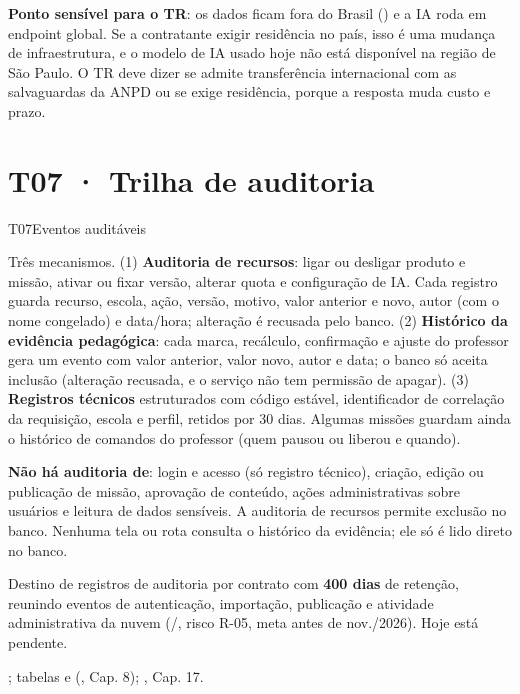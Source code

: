 \begin{atencao}
\textbf{Ponto sensível para o TR}: os dados ficam fora do Brasil
() e a IA roda em endpoint global. Se a contratante exigir
residência no país, isso é uma mudança de infraestrutura, e o modelo de IA
usado hoje não está disponível na região de São Paulo. O TR deve dizer se
admite transferência internacional com as salvaguardas da ANPD ou se exige
residência, porque a resposta muda custo e prazo.
\end{atencao}

\section{T07 · Trilha de auditoria}
\label{sec:t07}

\begin{resposta}{T07}{Eventos auditáveis}{\parcial}
\begin{campos}
  \item[Hoje] Três mecanismos. (1) \textbf{Auditoria de recursos}: ligar ou
    desligar produto e missão, ativar ou fixar versão, alterar quota e
    configuração de IA. Cada registro guarda recurso, escola, ação, versão,
    motivo, valor anterior e novo, autor (com o nome congelado) e data/hora;
    alteração é recusada pelo banco. (2) \textbf{Histórico da evidência
    pedagógica}: cada marca, recálculo, confirmação e ajuste do professor
    gera um evento com valor anterior, valor novo, autor e data; o banco só
    aceita inclusão (alteração recusada, e o serviço não tem permissão de
    apagar). (3) \textbf{Registros técnicos} estruturados com código estável,
    identificador de correlação da requisição, escola e perfil, retidos por 30
    dias. Algumas missões guardam ainda o histórico de comandos do professor
    (quem pausou ou liberou e quando).
  \item[Limitações] \textbf{Não há auditoria de}: login e acesso (só registro
    técnico), criação, edição ou publicação de missão, aprovação de conteúdo,
    ações administrativas sobre usuários e leitura de dados sensíveis. A
    auditoria de recursos permite exclusão no banco. Nenhuma tela ou rota
    consulta o histórico da evidência; ele só é lido direto no banco.
  \item[Planejado] Destino de registros de auditoria por contrato com
    \textbf{400 dias} de retenção, reunindo eventos de autenticação,
    importação, publicação e atividade administrativa da nuvem
    (/, risco R-05, meta antes de nov./2026). Hoje
    está pendente.
  \item[Evidência] ; tabelas
     e  (,
    Cap. 8); , Cap. 17.
\end{campos}
\end{resposta}

